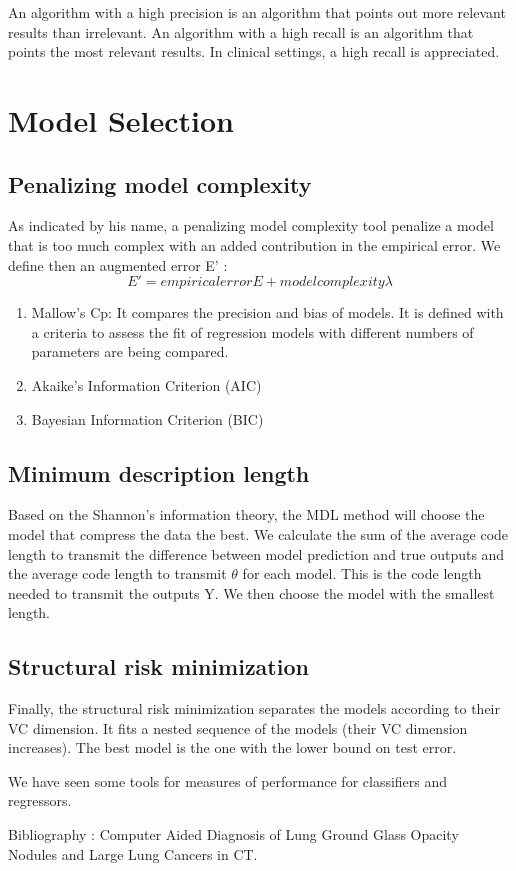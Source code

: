 \documentclass[a4paper,12pt]{article}
\begin{document}
An algorithm with a high precision is an algorithm that points out more relevant results than irrelevant.  
An algorithm with a high recall is an algorithm that points the most relevant results.
In clinical settings, a high recall is appreciated. 

\vspace{10pt}
\section{Model Selection}
\subsection{Penalizing model complexity}
As indicated by his name, a penalizing model complexity tool  penalize a model that is too much complex with an added contribution in the empirical error. We define then an augmented error E' : 
\[E' = empirical error E + model complexity   \lambda \]
\begin{enumerate}
\item Mallow's Cp:
It compares the precision and bias of models. It is defined with a criteria to assess the fit of regression models with different numbers of parameters are being compared.
\item Akaike's Information Criterion (AIC)
\item Bayesian Information Criterion (BIC)
\end{enumerate}
\subsection{Minimum description length}

Based on the Shannon's information theory, the MDL method will choose the model that compress the data the best.
We calculate the sum of the average code length to transmit the difference between model prediction and true outputs and the average code length to transmit $\theta$ for each model. This is the code length needed to transmit the outputs Y. We then choose the model with the smallest length. 
\subsection{Structural risk minimization}

Finally, the structural risk minimization separates the models according to their VC dimension. It fits a nested sequence of the models (their VC dimension increases). The best model is the one with the lower bound on test error.  

\vspace{10pt}
We have seen some tools for measures of performance for classifiers and regressors.
\vspace{60pt}

Bibliography : 
Computer Aided Diagnosis of Lung Ground Glass Opacity Nodules and Large Lung Cancers in CT.
\end{document}
